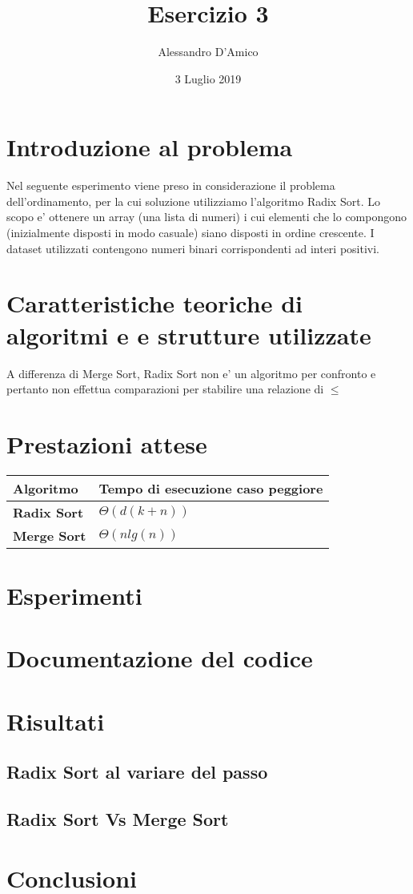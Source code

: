 \documentclass[a4paper]{article}
\title {{\TitleFont Esercizio 3}}
\date{3 Luglio 2019}
\author{{\AuthFont Alessandro D'Amico}}
\begin{document}
\begin{titlingpage}
\maketitle
\end{titlingpage}
\tableofcontents
\newpage
\section{Introduzione al problema}
Nel seguente esperimento viene preso in considerazione il problema dell'ordinamento, per la cui soluzione utilizziamo l'algoritmo Radix Sort.
Lo scopo e' ottenere un array (una lista di numeri) i cui elementi che lo compongono (inizialmente disposti in modo casuale) siano disposti in ordine crescente. I dataset utilizzati contengono numeri binari corrispondenti ad interi positivi.
\section{Caratteristiche teoriche di algoritmi e e strutture utilizzate}
A differenza di Merge Sort, Radix Sort non e' un algoritmo per confronto e pertanto non effettua comparazioni per stabilire una relazione di $\leq$
\section{Prestazioni attese}
	\begin{tabularx}{10cm}{|X|X|}
	\hline
	Algoritmo & Tempo di esecuzione caso peggiore \\
	\hline
	\textbf{Radix Sort} &  $\Theta(d(k+n))$ \\
	\hline
	\textbf{Merge Sort} &  $\Theta(nlg(n))$ \\
	\hline
	\end{tabularx}
\section{Esperimenti}
\section{Documentazione del codice}
\newpage
\section{Risultati}
\subsection{Radix Sort al variare del passo}
\subsection{Radix Sort Vs Merge Sort}

\section{Conclusioni}
\end{document}
